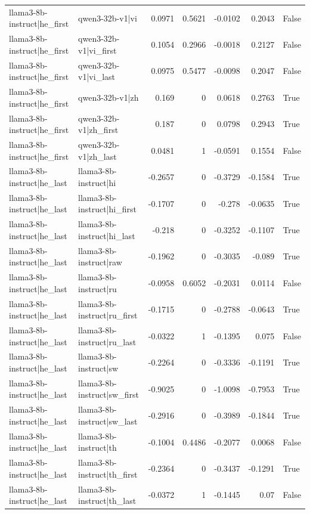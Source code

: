 \begin{table}
\begin{tabular}{l l r r r r l}
llama3-8b-instruct|he_first & qwen3-32b-v1|vi & 0.0971 & 0.5621 & -0.0102 & 0.2043 & False \\
llama3-8b-instruct|he_first & qwen3-32b-v1|vi_first & 0.1054 & 0.2966 & -0.0018 & 0.2127 & False \\
llama3-8b-instruct|he_first & qwen3-32b-v1|vi_last & 0.0975 & 0.5477 & -0.0098 & 0.2047 & False \\
llama3-8b-instruct|he_first & qwen3-32b-v1|zh & 0.169 & 0 & 0.0618 & 0.2763 & True \\
llama3-8b-instruct|he_first & qwen3-32b-v1|zh_first & 0.187 & 0 & 0.0798 & 0.2943 & True \\
llama3-8b-instruct|he_first & qwen3-32b-v1|zh_last & 0.0481 & 1 & -0.0591 & 0.1554 & False \\
llama3-8b-instruct|he_last & llama3-8b-instruct|hi & -0.2657 & 0 & -0.3729 & -0.1584 & True \\
llama3-8b-instruct|he_last & llama3-8b-instruct|hi_first & -0.1707 & 0 & -0.278 & -0.0635 & True \\
llama3-8b-instruct|he_last & llama3-8b-instruct|hi_last & -0.218 & 0 & -0.3252 & -0.1107 & True \\
llama3-8b-instruct|he_last & llama3-8b-instruct|raw & -0.1962 & 0 & -0.3035 & -0.089 & True \\
llama3-8b-instruct|he_last & llama3-8b-instruct|ru & -0.0958 & 0.6052 & -0.2031 & 0.0114 & False \\
llama3-8b-instruct|he_last & llama3-8b-instruct|ru_first & -0.1715 & 0 & -0.2788 & -0.0643 & True \\
llama3-8b-instruct|he_last & llama3-8b-instruct|ru_last & -0.0322 & 1 & -0.1395 & 0.075 & False \\
llama3-8b-instruct|he_last & llama3-8b-instruct|sw & -0.2264 & 0 & -0.3336 & -0.1191 & True \\
llama3-8b-instruct|he_last & llama3-8b-instruct|sw_first & -0.9025 & 0 & -1.0098 & -0.7953 & True \\
llama3-8b-instruct|he_last & llama3-8b-instruct|sw_last & -0.2916 & 0 & -0.3989 & -0.1844 & True \\
llama3-8b-instruct|he_last & llama3-8b-instruct|th & -0.1004 & 0.4486 & -0.2077 & 0.0068 & False \\
llama3-8b-instruct|he_last & llama3-8b-instruct|th_first & -0.2364 & 0 & -0.3437 & -0.1291 & True \\
llama3-8b-instruct|he_last & llama3-8b-instruct|th_last & -0.0372 & 1 & -0.1445 & 0.07 & False \\

\end{tabular}
\end{table}
